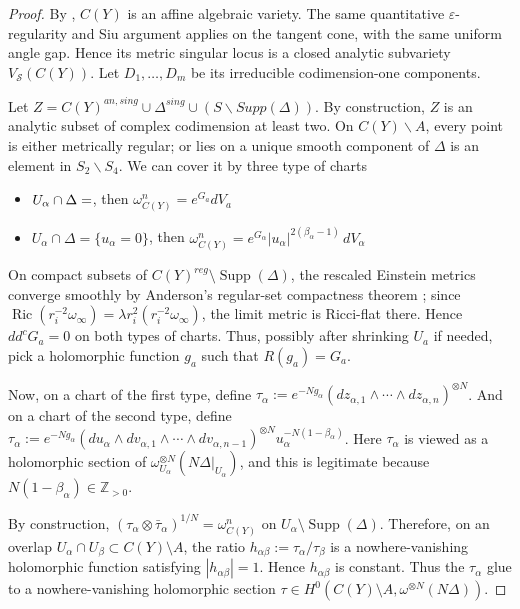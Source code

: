 \documentclass[11pt]{amsart}
\theoremstyle{definition}
\theoremstyle{remark}
\begin{document}
\begin{proof}
   By \cite[Section~4]{SLII}, $C(Y)$ is an affine algebraic variety. The same quantitative $\varepsilon$-regularity and Siu argument applies on the
  tangent cone, with the same uniform angle gap. Hence its metric singular locus
is a closed analytic subvariety $V_{\mathcal S}(C(Y))$. Let
$D_1,\ldots,D_m$ be its irreducible codimension-one components. 

   Let $Z = C(Y)^{an, sing} \cup \Delta^{sing} \cup (S \backslash Supp(\Delta))$. By construction, $Z$ is an analytic subset of complex codimension at least two. On $C(Y) \backslash A$, every point is either metrically regular; or lies on a unique smooth component of $\Delta$ is an element in $S_2 \backslash S_4$. We can cover it by three type of charts 

    \begin{itemize}
    \item $U_\alpha \cap \Delta = \empty$, then $\omega^n_{C(Y)}  = e^{G_a} dV_a$
    \item $U_\alpha \cap \Delta = \{u_\alpha = 0 \}$, then $\omega_{C(Y)}^n = e^{G_\alpha}
|u_\alpha|^{2(\beta_\alpha-1)}\,dV_\alpha$
    \end{itemize}

    On compact subsets of $C(Y)^{reg}\setminus\operatorname{Supp}(\Delta)$, the
rescaled Einstein metrics converge smoothly by Anderson's regular-set
compactness theorem \cite{AndersonRicci}; since
$\operatorname{Ric}(r_i^{-2}\omega_\infty)=\lambda r_i^2(r_i^{-2}\omega_\infty)$,
the limit metric is Ricci-flat there. Hence $dd^cG_a=0$ on both types of charts. Thus, possibly after shrinking $U_a$ if needed, pick a holomorphic function $g_a$ such that $R(g_a) = G_a$. 

    Now, on a chart of the first type, define $\tau_\alpha := e^{-N g_\alpha} (dz_{\alpha,1} \wedge \cdots \wedge dz_{\alpha,n})^{\otimes N}$. And on a chart of the second type, define $\tau_\alpha := e^{-N g_\alpha} (du_\alpha \wedge dv_{\alpha,1} \wedge \cdots \wedge dv_{\alpha,n-1})^{\otimes N} u_\alpha^{-N(1-\beta_\alpha)}$. Here $\tau_\alpha$ is viewed as a holomorphic section of $\omega_{U_\alpha}^{\otimes N}(N\Delta|_{U_\alpha})$, and this is legitimate because $N(1-\beta_\alpha) \in \mathbb{Z}_{> 0}$.
    
    By construction, $(\tau_\alpha \otimes \bar{\tau}_\alpha)^{1/N} = \omega_{C(Y)}^n$ on $U_\alpha \setminus \operatorname{Supp}(\Delta)$. Therefore, on an overlap $U_\alpha \cap U_\beta \subset C(Y) \setminus A$, the ratio $h_{\alpha\beta} := \tau_\alpha / \tau_\beta$ is a nowhere-vanishing holomorphic function satisfying $|h_{\alpha\beta}| = 1$. Hence $h_{\alpha\beta}$ is constant. Thus the $\tau_\alpha$ glue to a nowhere-vanishing holomorphic section $\tau \in H^0(C(Y)\setminus A, \omega^{\otimes N}(N\Delta))$.


\end{proof}
\end{document}
